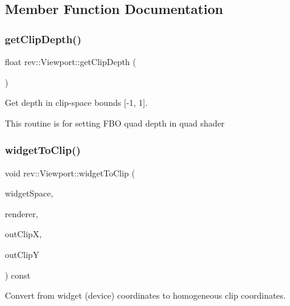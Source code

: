 \subsection{Member Function Documentation}
\mbox{\label{classrev_1_1_viewport_ae4a69bf1e2757fa69131123282c63c08}} 
\subsubsection{\texorpdfstring{getClipDepth()}{getClipDepth()}}
{\footnotesize\ttfamily float rev\+::\+Viewport\+::get\+Clip\+Depth (\begin{DoxyParamCaption}{ }\end{DoxyParamCaption})}



Get depth in clip-\/space bounds \mbox{[}-\/1, 1\mbox{]}. 

This routine is for setting F\+BO quad depth in quad shader \mbox{\label{classrev_1_1_viewport_a3dea0dbd5ee93f697941ef2da31e9185}} 
\subsubsection{\texorpdfstring{widgetToClip()}{widgetToClip()}}
{\footnotesize\ttfamily void rev\+::\+Viewport\+::widget\+To\+Clip (\begin{DoxyParamCaption}\item[{const \mbox{\hyperlink{classrev_1_1_vector}{Vector2}} \&}]{widget\+Space,  }\item[{const \mbox{\hyperlink{classrev_1_1_main_renderer}{Main\+Renderer}} \&}]{renderer,  }\item[{float \&}]{out\+ClipX,  }\item[{float \&}]{out\+ClipY }\end{DoxyParamCaption}) const}



Convert from widget (device) coordinates to homogeneous clip coordinates. 

